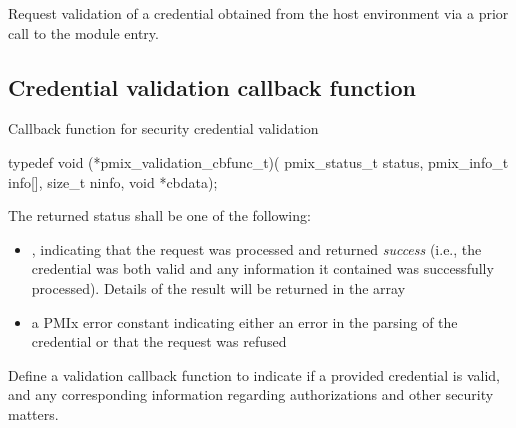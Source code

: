 \optattrend

\descr

Request validation of a credential obtained from the host environment via a prior call to the  module entry.


\subsection{Credential validation callback function}

\summary

Callback function for security credential validation

\format

\cspecificstart
\begin{codepar}
typedef void (*pmix_validation_cbfunc_t)(
                             pmix_status_t status,
                             pmix_info_t info[], size_t ninfo,
                             void *cbdata);
\end{codepar}
\cspecificend

\begin{arglist}
\end{arglist}

The returned status shall be one of the following:

\begin{itemize}
    \item {}, indicating that the request was processed and returned \textit{success} (i.e., the credential was both valid and any information it contained was successfully processed). Details of the result will be returned in the  array
    \item a PMIx error constant indicating either an error in the parsing of the credential or that the request was refused
\end{itemize}

\descr

Define a validation callback function to indicate if a provided credential is valid, and any corresponding information regarding authorizations and other security matters.


